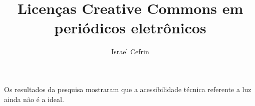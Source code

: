 \documentclass[11pt, oneside]{article}   	%
\title{Licenças Creative Commons em periódicos eletrônicos}
\author{Israel Cefrin}
\begin{document}
\maketitle

Os resultados da pesquisa mostraram que a acessibilidade técnica referente a luz ainda não é a ideal.
\end{document}
